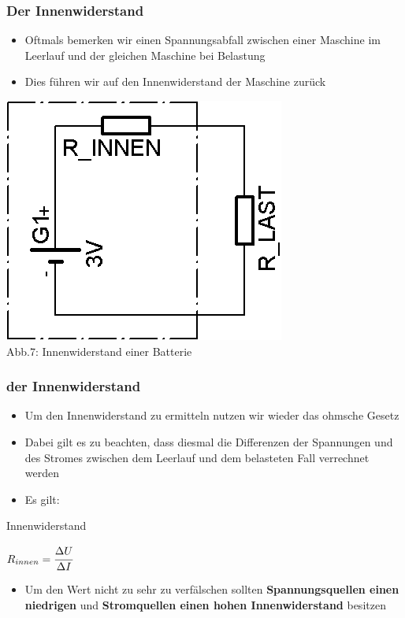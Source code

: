 \begin{frame}
	\frametitle{Der Innenwiderstand}
	\begin{itemize}
		\item	Oftmals bemerken wir einen Spannungsabfall zwischen einer Maschine im Leerlauf und der gleichen Maschine bei Belastung
		\item	Dies führen wir auf den Innenwiderstand der Maschine zurück
	\end{itemize}
	\begin{center}
 		\includegraphics[scale=1.4]{e03/Innenwiderstand.png}\\
 		\small{Abb.7: Innenwiderstand einer Batterie}
 	\end{center}
\end{frame}

\begin{frame}
	\frametitle{der Innenwiderstand}
	\begin{itemize}
		\item	Um den Innenwiderstand zu ermitteln nutzen wir wieder das ohmsche Gesetz
		\item	Dabei gilt es zu beachten, dass diesmal die Differenzen der Spannungen und des Stromes zwischen dem Leerlauf und dem belasteten Fall verrechnet werden
		\item	Es gilt:
	\end{itemize}
	\begin{block}{Innenwiderstand}
	  \begin{center}
	    $R_{innen} = \cfrac{\Delta U}{\Delta I}$
	  \end{center}
	\end{block}
	\begin{itemize}
	  \item	Um den Wert nicht zu sehr zu verfälschen sollten \textbf{Spannungsquellen einen niedrigen} und \textbf{Stromquellen einen hohen Innenwiderstand} besitzen
	\end{itemize}
\end{frame}

